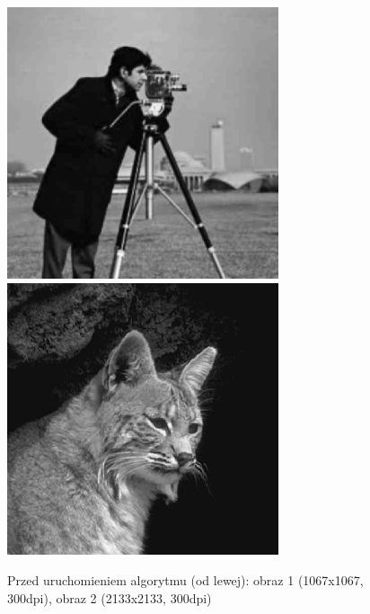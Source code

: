 \documentclass[a4paper,12pt]{book}
\begin{document}
\begin{figure}
	\caption{Przed uruchomieniem algorytmu (od lewej): obraz 1 (1067x1067, 300dpi), obraz 2 (2133x2133, 300dpi)}
	\includegraphics[width=8cm, height=8cm]{man-unmodified.jpg}
	\includegraphics[width=8cm, height=8cm]{cat-unmodified.jpg}
\end{figure}
\end{document}
